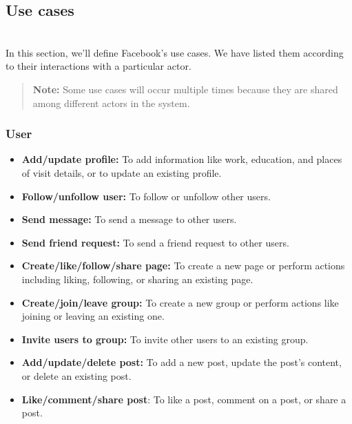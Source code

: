 \subsection{Use cases}\label{hTYPmWhIDrxDNBzR3GSsL}
\\
In this section, we'll define Facebook's use cases. We have listed them according to their interactions with a particular actor.
\begin{quote}
\textbf{Note:} Some use cases will occur multiple times because they are shared among different actors in the system.
\end{quote}
\subsubsection{User}\label{OTjnh7B38pHFr7Kvy5xDc}

\begin{itemize}
\item
\protect{}\label{F_7fYgob8Nd3YIjdgQ84D}
\textbf{Add/update profile:} To add information like work, education, and places of visit details, or to update an existing profile.
\item
\protect{}\label{JHmr130q4QyXi7RW4WCrg}
\textbf{Follow/unfollow user:} To follow or unfollow other users.
\item
\protect{}\label{PmQC4TgZ-x9qJxn3DIlja}
\textbf{Send message:} To send a message to other users.
\item
\protect{}\label{MAqy3CU0ludy3vopAYuDt}
\textbf{Send friend request:} To send a friend request to other users.
\item
\protect{}\label{CxeknDRlgzzHJw-hUZu2D}
\textbf{Create/like/follow/share page:} To create a new page or perform actions including liking, following, or sharing an existing page.
\item
\protect{}\label{TZ_i2_Uow9xh6K5LQDQ2f}
\textbf{Create/join/leave group:} To create a new group or perform actions like joining or leaving an existing one.
\item
\protect{}\label{HsiFbA4PyJ5CYNodXoLAC}
\textbf{Invite users to group:} To invite other users to an existing group.
\item
\protect{}\label{ZEqjAESY5TIxmsi2UpGcX}
\textbf{Add/update/delete post:} To add a new post, update the post's content, or delete an existing post.
\item
\protect{}\label{uyiimXdtCr53Du7ZL8V4T}
\textbf{Like/comment/share post}: To like a post, comment on a post, or share a post.

\end{itemize}

